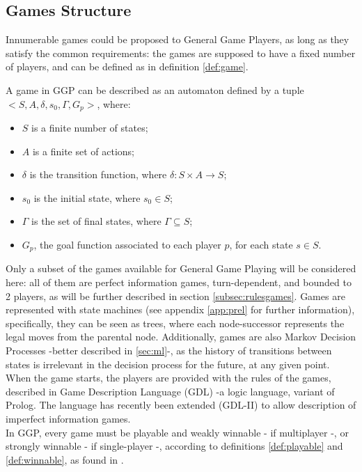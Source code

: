 \subsection{Games Structure}
Innumerable games could be proposed to General Game Players, as long as they satisfy the common requirements: the games are supposed to have a fixed number of players, and can be defined as in definition \ref{def:game}.\\
\begin{definition}\label{def:game}
A game in GGP can be described as an automaton defined by a tuple ${<S,A,\delta,s_0,\Gamma, G_p>}$, where:
\begin{itemize}
\item ${S}$ is a finite number of states;
\item ${A}$ is a finite set of actions;
\item ${\delta}$ is the transition function, where ${\delta: S \times A \rightarrow S}$;
\item ${s_0}$ is the initial state, where ${s_0 \in S}$;
\item ${\Gamma}$ is the set of final states, where ${\Gamma \subseteq S}$;
\item ${G_p}$, the goal function associated to each player ${p}$, for each state $s \in S$.
\end{itemize}
\end{definition}
Only a subset of the games available for General Game Playing will be considered here: all of them are perfect information games, turn-dependent, and bounded to 2 players, as will be further described in section \ref{subsec:rulesgames}.
Games are represented with state machines (see appendix \ref{app:prel} for further information), specifically, they can be seen as trees, where each node-successor represents the legal moves from the parental node. Additionally, games are also Markov Decision Processes\cite{bellman1957markovian} -better described in \ref{sec:ml}-, as the history of transitions between states is irrelevant in the decision process for the future, at any given point\cite[p.~189]{genesereth2014general}.\\
When the game starts, the players are provided with the rules of the games, described in Game Description Language (GDL)\cite{love2008general} -a logic language, variant of Prolog. The language has recently been extended (GDL-II) to allow description of imperfect information games\cite{thielscher2010general,schiffel2011reasoning}.\\
In GGP, every game must be playable and weakly winnable - if multiplayer -, or strongly winnable - if single-player -, according to definitions \ref{def:playable} and \ref{def:winnable}, as found in \cite{genesereth2005general}.\\
